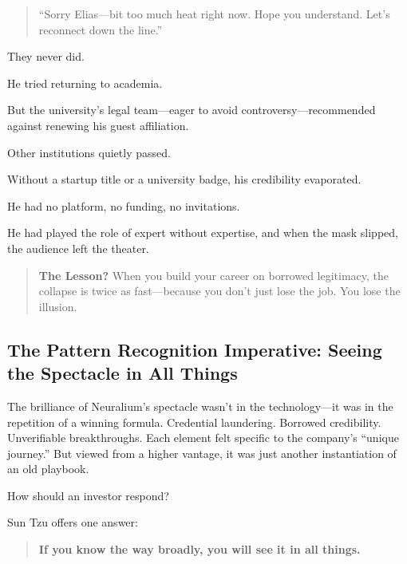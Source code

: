 \begin{quote}
“Sorry Elias—bit too much heat right now. Hope you understand. Let’s reconnect down the line.”
\end{quote}

They never did.

\medskip

He tried returning to academia.

But the university’s legal team—eager to avoid controversy—recommended against renewing his guest affiliation.

Other institutions quietly passed.

Without a startup title or a university badge, his credibility evaporated.

He had no platform, no funding, no invitations.

He had played the role of expert without expertise, and when the mask slipped, the audience left the theater.

\begin{quote}
\textbf{The Lesson?} When you build your career on borrowed legitimacy, the collapse is twice as fast—because you don’t just lose the job. You lose the illusion.
\end{quote}















\subsection{The Pattern Recognition Imperative: Seeing the Spectacle in All Things}

The brilliance of Neuralium’s spectacle wasn’t in the technology—it was in the repetition of a winning formula. 
Credential laundering. Borrowed credibility. Unverifiable breakthroughs.  
Each element felt specific to the company’s “unique journey.” But viewed from a higher vantage, it was just another 
instantiation of an old playbook.

How should an investor respond?

Sun Tzu offers one answer:

\begin{quote}
\textbf{If you know the way broadly, you will see it in all things.}
\end{quote}


